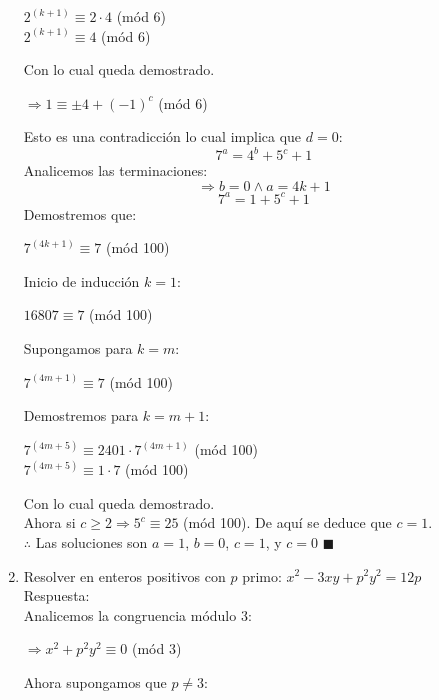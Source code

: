 \documentclass{book}
\begin{document}
\begin{enumerate}
\begin{center}
            $2^{(k+1)}\equiv 2\cdot 4$ (mód 6)\\
            $2^{(k+1)}\equiv 4$ (mód 6)\\
        \end{center}
        Con lo cual queda demostrado.
        \begin{center}
            $\Rightarrow 1\equiv \pm 4+{(-1)}^c$  (mód 6)\\
        \end{center}
        Esto es una contradicción lo cual implica que $d=0$:\\
        $$7^a=4^b+5^c+1$$
        Analicemos las terminaciones:
        $$\Rightarrow b=0 \wedge a=4k+1$$
        $$7^a=1+5^c+1$$
        Demostremos que:
        \begin{center}
            $7^{(4k+1)}\equiv 7$ (mód 100)\\
        \end{center}
        Inicio de inducción $k=1$:
        \begin{center}
            $16807\equiv 7$ (mód 100)\\
        \end{center}
        Supongamos para $k=m$:
        \begin{center}
            $7^{(4m+1)}\equiv 7$ (mód 100)\\
        \end{center}
        Demostremos para $k=m+1$:
        \begin{center}
            $7^{(4m+5)}\equiv 2401\cdot 7^{(4m+1)}$  (mód 100)\\
            $7^{(4m+5)}\equiv 1\cdot 7$ (mód 100)\\
        \end{center}
        Con lo cual queda demostrado.\\
        Ahora si $c\geq 2\Rightarrow 5^c\equiv 25$ (mód 100). De aquí se deduce que $c=1$.\\
        $\therefore$ Las soluciones son $a=1$, $b=0$, $c=1$, y $c=0$ $\blacksquare$\\
        \item Resolver en enteros positivos con $p$ primo: $x^2-3xy+p^2y^2=12p$ \\
        Respuesta:\\
        Analicemos la congruencia módulo 3:
        \begin{center}
            $\Rightarrow x^2+p^2 y^2\equiv 0$ (mód 3)
        \end{center}
        Ahora supongamos que $p\neq3$:

\end{enumerate}
\end{document}
